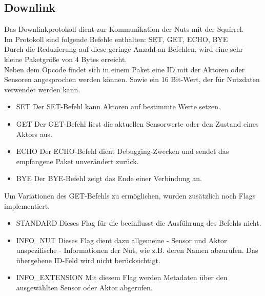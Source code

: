 \documentclass[12pt,a4paper]{article}
\begin{document}
	\subsection{Downlink}  
Das Downlinkprotokoll dient zur Kommunikation der Nuts mit der Squirrel.\\
Im Protokoll sind folgende Befehle enthalten: SET, GET, ECHO, BYE\\
Durch die Reduzierung auf diese geringe Anzahl an Befehlen, wird eine sehr kleine Paketgröße von 4 Bytes erreicht.\\
Neben dem Opcode findet sich in einem Paket eine ID mit der Aktoren oder Sensoren angesprochen werden können. Sowie ein 16 Bit-Wert, der für Nutzdaten verwendet werden kann.\\
\begin{itemize}
	\item{SET}
Der SET-Befehl kann Aktoren auf bestimmte Werte setzen.
	\item{GET}
Der GET-Befehl liest die aktuellen Sensorwerte oder den Zustand eines Aktors aus.
	\item{ECHO}
Der ECHO-Befehl dient Debugging-Zwecken und sendet das empfangene Paket unverändert zurück.
	\item{BYE}
Der BYE-Befehl zeigt das Ende einer Verbindung an.
\end{itemize}
Um Variationen des GET-Befehls zu ermöglichen, wurden zusätzlich noch Flags implementiert.\\
\begin{itemize}
	\item{STANDARD}
Dieses Flag für die beeinflusst die Ausführung des Befehls nicht.
	\item{INFO\_NUT}
Dieses Flag dient dazu allgemeine - Sensor und Aktor unspezifische - Informationen der Nut, wie z.B. deren Namen abzurufen. Das übergebene ID-Feld wird nicht berücksichtigt.\\
	\item{INFO\_EXTENSION}
Mit diesem Flag werden Metadaten über den ausgewählten Sensor oder Aktor abgerufen.
\end{itemize}
\end{document}
